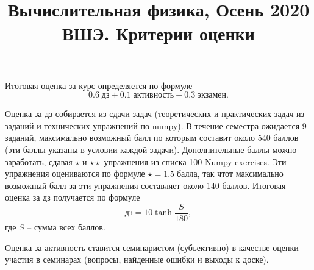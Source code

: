 \documentclass[prb,papersize=a4paper,notitlepage]{revtex4-1}%
\begin{document}
\title{Вычислительная физика, Осень 2020 ВШЭ. Критерии оценки}
\maketitle
Итоговая оценка за курс определяется по формуле $$0.6\;\textrm{дз} + 0.1\;\textrm{активность} + 0.3\;\textrm{экзамен}.$$

Оценка за дз собирается из сдачи задач (теоретических и практических задач из заданий и технических упражнений по numpy). В течение семестра ожидается 9 заданий, максимально возможный балл по которым составит около 540 баллов (эти баллы указаны в условии каждой задачи). Дополнительные баллы можно заработать, сдавая $\star$ и $\star\star$ упражнения из списка \href{https://github.com/rougier/numpy-100/blob/master/100_Numpy_exercises.md}{100 Numpy exercises}. Эти упражнения оцениваются по формуле $\star = 1.5 \;\textrm{балла}$, так чтот максимально возможный балл за эти упражнения составляет около 140 баллов. Итоговая оценка за дз получается по формуле $$\textrm{дз} = 10\tanh\frac{S}{180},$$ где $S$ -- сумма всех баллов.

Оценка за активность ставится семинаристом (субъективно) в качестве оценки участия в семинарах (вопросы, найденные ошибки и выходы к доске).
\end{document}
